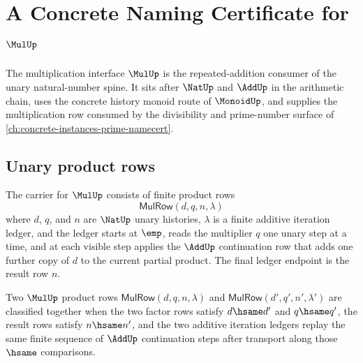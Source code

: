 \chapter{A Concrete Naming Certificate for $\MulUp$}
\label{ch:concrete-instances-mul-namecert}

The multiplication interface $\MulUp$ is the repeated-addition consumer of the unary natural-number spine. It sits after $\NatUp$ and $\AddUp$ in the arithmetic chain, uses the concrete history monoid route of $\MonoidUp$, and supplies the multiplication row consumed by the divisibility and prime-number surface of \autoref{ch:concrete-instances-prime-namecert}.

\section{Unary product rows}

\begin{definition}
\label{def:mul-unary-product-carrier}
The carrier for $\MulUp$ consists of finite product rows
$$
\mathsf{MulRow}(d,q,n,\lambda)
$$
where $d$, $q$, and $n$ are $\NatUp$ unary histories, $\lambda$ is a finite additive iteration ledger, and the ledger starts at $\emp$, reads the multiplier $q$ one unary step at a time, and at each visible step applies the $\AddUp$ continuation row that adds one further copy of $d$ to the current partial product. The final ledger endpoint is the result row $n$.
\end{definition}

\begin{definition}
\label{def:mul-unary-product-classifier}
Two $\MulUp$ product rows $\mathsf{MulRow}(d,q,n,\lambda)$ and $\mathsf{MulRow}(d',q',n',\lambda')$ are classified together when the two factor rows satisfy $d\hsame d'$ and $q\hsame q'$, the result rows satisfy $n\hsame n'$, and the two additive iteration ledgers replay the same finite sequence of $\AddUp$ continuation steps after transport along those $\hsame$ comparisons.
\end{definition}

